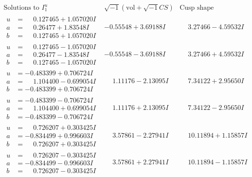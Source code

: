 \documentclass[1p]{elsarticle_modified}
\theoremstyle{definition}
\newcommand{\I}{\sqrt{-1}}
\begin{document}
$$\begin{array}{c|c|c}  
\text{Solutions to }I^u_{1}& \I (\text{vol} + \sqrt{-1}CS) & \text{Cusp shape}\\
 \hline 
\begin{aligned}
u &= \phantom{-}0.127465 + 1.057020 I \\
a &= \phantom{-}0.26477 + 1.83548 I \\
b &= \phantom{-}0.127465 + 1.057020 I\end{aligned}
 & -0.55548 + 3.69188 I & \phantom{-}3.27466 - 4.59532 I \\ \hline\begin{aligned}
u &= \phantom{-}0.127465 - 1.057020 I \\
a &= \phantom{-}0.26477 - 1.83548 I \\
b &= \phantom{-}0.127465 - 1.057020 I\end{aligned}
 & -0.55548 - 3.69188 I & \phantom{-}3.27466 + 4.59532 I \\ \hline\begin{aligned}
u &= -0.483399 + 0.706724 I \\
a &= \phantom{-}1.104400 - 0.699054 I \\
b &= -0.483399 + 0.706724 I\end{aligned}
 & \phantom{-}1.11176 - 2.13095 I & \phantom{-}7.34122 + 2.95650 I \\ \hline\begin{aligned}
u &= -0.483399 - 0.706724 I \\
a &= \phantom{-}1.104400 + 0.699054 I \\
b &= -0.483399 - 0.706724 I\end{aligned}
 & \phantom{-}1.11176 + 2.13095 I & \phantom{-}7.34122 - 2.95650 I \\ \hline\begin{aligned}
u &= \phantom{-}0.726207 + 0.303425 I \\
a &= -0.834499 + 0.996603 I \\
b &= \phantom{-}0.726207 + 0.303425 I\end{aligned}
 & \phantom{-}3.57861 - 2.27941 I & \phantom{-}10.11894 + 1.15857 I \\ \hline\begin{aligned}
u &= \phantom{-}0.726207 - 0.303425 I \\
a &= -0.834499 - 0.996603 I \\
b &= \phantom{-}0.726207 - 0.303425 I\end{aligned}
 & \phantom{-}3.57861 + 2.27941 I & \phantom{-}10.11894 - 1.15857 I \\ \hline\begin{aligned}

\end{aligned}
\end{array}$$
\end{document}
